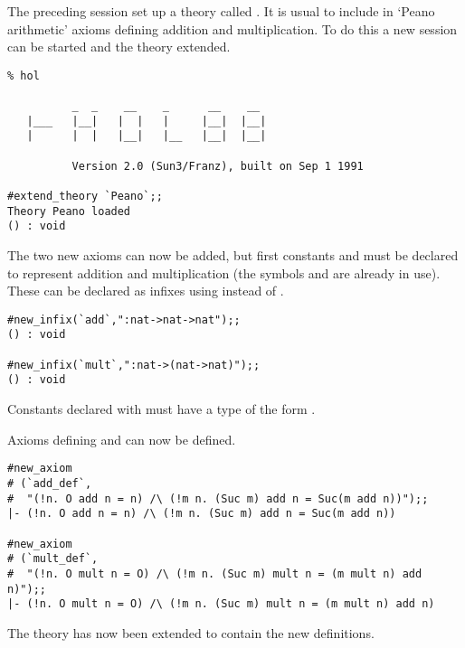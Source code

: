 The preceding session set up a theory called . It is usual
to include in `Peano arithmetic' axioms defining addition and multiplication.
To do this a new session can be started and the theory extended.

\begin{session}\begin{verbatim}
% hol

          _  _    __    _      __    __
   |___   |__|   |  |   |     |__|  |__|
   |      |  |   |__|   |__   |__|  |__|

          Version 2.0 (Sun3/Franz), built on Sep 1 1991

#extend_theory `Peano`;;
Theory Peano loaded
() : void
\end{verbatim}\end{session}

\noindent The two new axioms can now be added, but first constants  and
 must  be  declared  to  represent  addition  and  multiplication (the
symbols \ml{+}  and  \ml{*}  are  already in  use).   These can  be declared as
infixes using  instead of .

\begin{session}\begin{verbatim}
#new_infix(`add`,":nat->nat->nat");;
() : void

#new_infix(`mult`,":nat->(nat->nat)");;
() : void
\end{verbatim}\end{session}

\noindent Constants declared with 
must have a type of the form
\ml{$\sigma$->($\sigma$->$\sigma$)}.

Axioms defining  and  can now be defined.

\begin{session}\begin{verbatim}
#new_axiom
# (`add_def`,
#  "(!n. O add n = n) /\ (!m n. (Suc m) add n = Suc(m add n))");;
|- (!n. O add n = n) /\ (!m n. (Suc m) add n = Suc(m add n))

#new_axiom
# (`mult_def`,
#  "(!n. O mult n = O) /\ (!m n. (Suc m) mult n = (m mult n) add n)");;
|- (!n. O mult n = O) /\ (!m n. (Suc m) mult n = (m mult n) add n)
\end{verbatim}\end{session}

\noindent The theory  has now been extended to contain the new
definitions.

